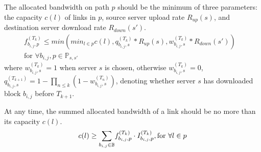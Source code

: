 \begin{packeditemize}

\item The allocated bandwidth on path $p$ should be the minimum of three parameters: the capacity $c(l)$ of links in $p$, source server upload rate $R_{up}(s)$, and destination server download rate $R_{down}(s')$.%
\begin{equation}
\begin{split}
f^{(T_k)}_{b_{i,j},p} \leq min\left(min_{l\in p} c(l), q_{b_{i,j},s}^{(T_k)}*R_{up}(s), w_{b_{i,j},s}^{(T_k)}*R_{down}(s')\right) &\\
\text{for }\forall b_{i,j}, p\in \mathbb{P}_{s,s'} &%
\end{split}
\end{equation}
where $w_{b_{i,j},s}^{(T_k)}=1$ when server $s$ is chosen, otherwise $w_{b_{i,j},s}^{(T_k)}=0$, $q_{b_{i,j},s}^{(T_{k+1})} = 1-\prod_{n\leq k} (1-w_{b_{i,j},s}^{(T_n)})$, denoting whether server $s$ has downloaded block $b_{i,j}$ before $T_{k+1}$.

\item At any time, the summed allocated bandwidth of a link should be no more than its capacity $c(l)$.
\begin{equation}
c(l) \geq \displaystyle{\sum_{b_{i,j} \in \mathbb{B}}} f^{(T_k)}_{b_{i,j},p} \cdot I^{(T_k)}_{b_{i,j},p}, \text{for }\forall l\in p\\
\end{equation}


\end{packeditemize}
